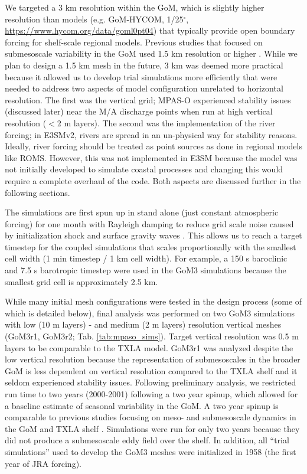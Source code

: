 We targeted a 3 km resolution within the GoM, which is slightly higher resolution than models (e.g. GoM-HYCOM, 1/25$^\circ$, \url{https://www.hycom.org/data/goml0pt04}) that typically provide open boundary forcing for shelf-scale regional models. Previous studies that focused on submesoscale variability in the GoM used 1.5 km resolution or higher \citep{barkan2017submesoscalepart2, bracco2019mesoscale, liu2021submesoscale}. While we plan to design a 1.5 km mesh in the future, 3 km was deemed more practical because it allowed us to develop trial simulations more efficiently that were needed to address two aspects of model configuration unrelated to horizontal resolution. The first was the vertical grid; MPAS-O experienced stability issues (discussed later) near the M/A discharge points when run at high vertical resolution ($<$2 m layers). The second was the implementation of the river forcing; in E3SMv2, rivers are spread in an un-physical way for stability reasons. Ideally, river forcing should be treated as point sources as done in regional models like ROMS. However, this was not implemented in E3SM because the model was not initially developed to simulate coastal processes and changing this would require a complete overhaul of the code. Both aspects are discussed further in the following sections. 

The simulations are first spun up in stand alone (just constant atmospheric forcing) for one month with Rayleigh damping to reduce grid scale noise caused by initialization shock and surface gravity waves \citep{petersen2018mpas}. This allows us to reach a target timestep for the coupled simulations that scales proportionally with the smallest cell width (1 min timestep / 1 km cell width). For example, a 150 s baroclinic and 7.5 s barotropic timestep were used in the GoM3 simulations because the smallest grid cell is approximately 2.5 km.

While many initial mesh configurations were tested in the design process (some of which is detailed below), final analysis was performed on two GoM3 simulations with low (10 m layers) - and medium (2 m layers) resolution vertical meshes (GoM3r1, GoM3r2; Tab. \ref{tab:mpaso_sims}). Target vertical resolution was 0.5 m layers to be comparable to the TXLA model. GoM3r1 was analyzed despite the low vertical resolution because the representation of submesoscales in the broader GoM is less dependent on vertical resolution compared to the TXLA shelf and it seldom experienced stability issues. Following preliminary analysis, we restricted run time to two years (2000-2001) following a two year spinup, which allowed for a baseline estimate of seasonal variability in the GoM. A two year spinup is comparable to previous studies focusing on meso- and submesoscale dynamics in the GoM and TXLA shelf \citep{Barkan_2017, Kobashi_2020}. Simulations were run for only two years because they did not produce a submesoscale eddy field over the shelf.  In addition, all ``trial simulations'' used to develop the GoM3 meshes were initialized in 1958 (the first year of JRA forcing).

